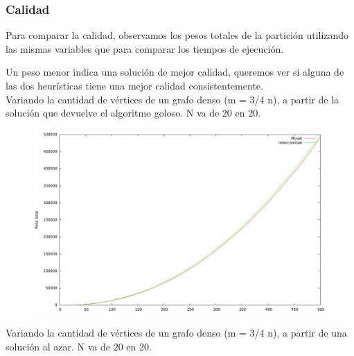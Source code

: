 \newpage \subsubsection{Calidad}

Para comparar la calidad, observamos los pesos totales de la partición
utilizando las mismas variables que para comparar los tiempos de ejecución.

Un peso menor indica una solución de mejor calidad, queremos ver si alguna
de las dos heurísticas tiene una mejor calidad consistentemente.
\\

Variando la cantidad de vértices de un grafo denso (m = 3/4 n), a partir de la
solución que devuelve el algoritmo goloso. N va de 20 en 20.
\vspace*{0.5cm}

\begin{figure}[h]
  \begin{center}
    \includegraphics[scale=0.35]{imagenes/local-goloso-n-peso.png}
  \end{center}
\end{figure}

\vspace*{0.5cm}

Variando la cantidad de vértices de un grafo denso (m = 3/4 n), a partir de una
solución al azar. N va de 20 en 20.
\vspace*{0.5cm}

